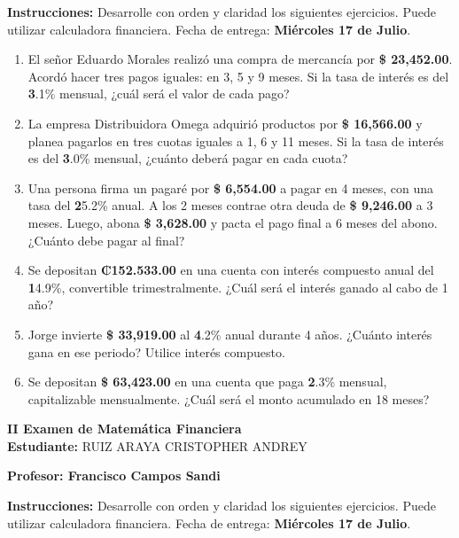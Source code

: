 \documentclass[14pt]{article}
\begin{document}
\textbf{Instrucciones:} Desarrolle con orden y claridad los siguientes ejercicios. Puede utilizar calculadora financiera. Fecha de entrega: \textbf{Miércoles 17 de Julio}.

\begin{enumerate}
  \item El señor Eduardo Morales realizó una compra de mercancía por \textbf{\$ 23,452.00}. Acordó hacer tres pagos iguales: en 3, 5 y 9 meses. Si la tasa de interés es del \textbf3.1\% mensual, ¿cuál será el valor de cada pago?

  \item La empresa Distribuidora Omega adquirió productos por \textbf{\$ 16,566.00} y planea pagarlos en tres cuotas iguales a 1, 6 y 11 meses. Si la tasa de interés es del \textbf3.0\% mensual, ¿cuánto deberá pagar en cada cuota?

  \item Una persona firma un pagaré por \textbf{\$ 6,554.00} a pagar en 4 meses, con una tasa del \textbf25.2\% anual. A los 2 meses contrae otra deuda de \textbf{\$ 9,246.00} a 3 meses. Luego, abona \textbf{\$ 3,628.00} y pacta el pago final a 6 meses del abono. ¿Cuánto debe pagar al final?

  \item Se depositan \textbf{₡152.533.00} en una cuenta con interés compuesto anual del \textbf14.9\%, convertible trimestralmente. ¿Cuál será el interés ganado al cabo de 1 año?

  \item Jorge invierte \textbf{\$ 33,919.00} al \textbf4.2\% anual durante 4 años. ¿Cuánto interés gana en ese periodo? Utilice interés compuesto.

  \item Se depositan \textbf{\$ 63,423.00} en una cuenta que paga \textbf2.3\% mensual, capitalizable mensualmente. ¿Cuál será el monto acumulado en 18 meses?
\end{enumerate}
\newpage

\begin{center}
    {\LARGE \textbf{II Examen de Matemática Financiera}}\\[1em]
    {\large \textbf{Estudiante:} RUIZ ARAYA CRISTOPHER ANDREY}
\end{center}

\vspace{1cm}

\textbf{Profesor: Francisco Campos Sandi}

\textbf{Instrucciones:} Desarrolle con orden y claridad los siguientes ejercicios. Puede utilizar calculadora financiera. Fecha de entrega: \textbf{Miércoles 17 de Julio}.
\end{document}
